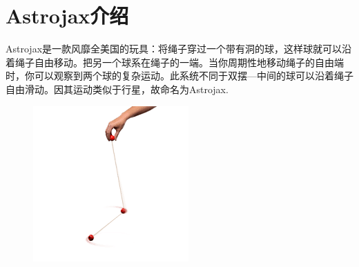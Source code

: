 \documentclass[12pt,a4paper]{ctexart}
\begin{document}
	\clearpage
	\thispagestyle{empty}
	\section{Astrojax介绍}
	Astrojax是一款风靡全美国的玩具：将绳子穿过一个带有洞的球，这样球就可以沿着绳子自由移动。把另一个球系在绳子的一端。当你周期性地移动绳子的自由端时，你可以观察到两个球的复杂运动。此系统不同于双摆---中间的球可以沿着绳子自由滑动。因其运动类似于行星，故命名为Astrojax.
	
			\begin{figure}[h] %
		\centering %
		\includegraphics[scale=0.5]{T0102.png}
	\end{figure}%
	
\end{document}
